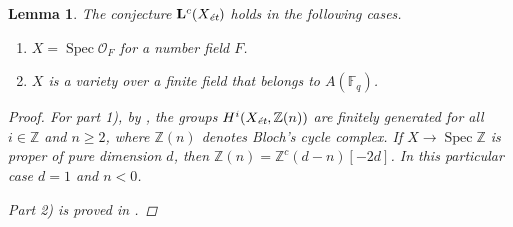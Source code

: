 \documentclass{article}
\DeclareMathOperator{\Spec}{Spec}
\newcommand{\FF}{\mathbb{F}}
\newcommand{\ZZ}{\mathbb{Z}}
\newcommand{\et}{\text{\it ét}}
\newtheorem{lemma}[theorem]{Lemma}
\theoremstyle{definition}
\numberwithin{equation}{section}
\begin{document}
\begin{lemma}
  \label{lemma:Lc(Xet)-holds-for-OF-and-A(Fq)}
  The conjecture $\mathbf{L}^c (X_\et)$ holds in the following cases.

  \begin{enumerate}
  \item[1)] $X = \Spec \mathcal{O}_F$ for a number field $F$.

  \item[2)] $X$ is a variety over a finite field that belongs to $A (\FF_q)$.
  \end{enumerate}

  \begin{proof}
    For part 1), by \cite[Theorem~5.1~(b)]{Morin-2014}, the groups
    $H^i (X_\et, \ZZ(n))$ are finitely generated for all $i \in \ZZ$ and
    $n \ge 2$, where $\ZZ (n)$ denotes Bloch's cycle complex. If
    $X \to \Spec \ZZ$ is proper of pure dimension $d$, then
    $\ZZ (n) = \ZZ^c (d-n) [-2d]$. In this particular case $d = 1$ and $n < 0$.

    Part 2) is proved in \cite[Proposition~5.7]{Morin-2014}.
  \end{proof}
\end{lemma}
\end{document}
